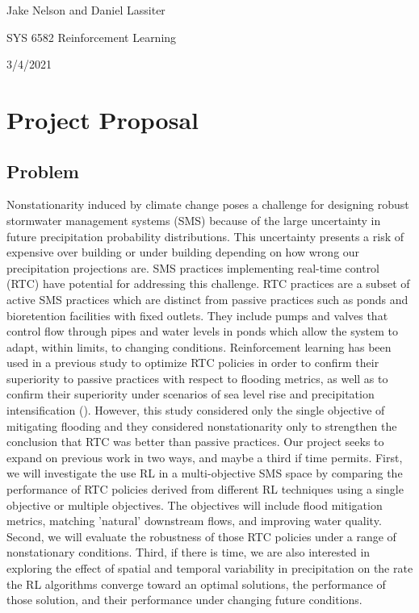 \documentclass[11pt,a4paper]{article}
\begin{document}
Jake Nelson and Daniel Lassiter

SYS 6582 Reinforcement Learning

3/4/2021

\section*{Project Proposal}


\subsection*{Problem}
Nonstationarity induced by climate change poses a challenge for designing robust stormwater management systems (SMS) because of the large uncertainty in future precipitation probability distributions. This uncertainty presents a risk of expensive over building or under building depending on how wrong our precipitation projections are. SMS practices implementing real-time control (RTC) have potential for addressing this challenge. RTC practices are a subset of active SMS practices which are distinct from passive practices such as ponds and bioretention facilities with fixed outlets. They include pumps and valves that control flow through pipes and water levels in ponds which allow the system to adapt, within limits, to changing conditions. Reinforcement learning has been used in a previous study to optimize RTC policies in order to confirm their superiority to passive practices with respect to flooding metrics, as well as to confirm their superiority under scenarios of sea level rise and precipitation intensification (\cite{bowes2020joh}). However, this study considered only the single objective of mitigating flooding and they considered nonstationarity only to strengthen the conclusion that RTC was better than passive practices. Our project seeks to expand on previous work in two ways, and maybe a third if time permits. First, we will investigate the use RL in a multi-objective SMS space by comparing the performance of RTC policies derived from different RL techniques using a single objective or multiple objectives. The objectives will include flood mitigation metrics, matching 'natural' downstream flows, and improving water quality. Second, we will evaluate the robustness of those RTC policies under a range of nonstationary conditions. Third, if there is time, we are also interested in exploring the effect of spatial and temporal variability in precipitation on the rate the RL algorithms converge toward an optimal solutions, the performance of those solution, and their performance under changing future conditions.
\end{document}
